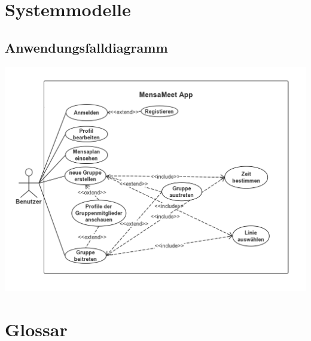 \documentclass[a4paper]{scrreprt}
\begin{document}
\chapter{Systemmodelle}
\section{Anwendungsfalldiagramm}	

\begin{center}
	\includegraphics[scale=0.5]{useCase_MensaMeet.jpg}
\end{center}

\chapter{Glossar}
 

 
\end{document}
